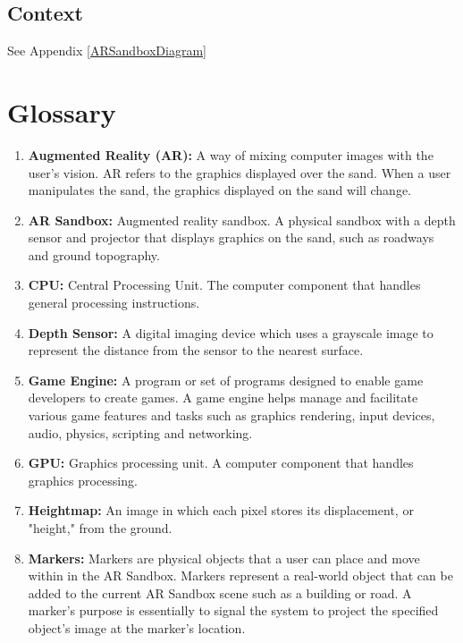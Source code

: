 \documentclass[letterpaper, 10pt, onecolumn, draftclsnofoot]{IEEEtran}
\begin{document}
    \subsection{Context}
    \begin{center}
        See Appendix \ref{ARSandboxDiagram}
    \end{center}
\section{Glossary} 
    \begin{enumerate}[label=]
         \item {\textbf{Augmented Reality (AR):} A way of mixing computer images with the user’s vision. AR refers to the graphics displayed over the sand. When a user manipulates the sand, the graphics displayed on the sand will change.} 
         
        \item {\textbf{AR Sandbox:} Augmented reality sandbox. A physical sandbox with a depth sensor and projector that displays graphics on the sand, such as roadways and ground topography.}
        
        \item {\textbf{CPU:} Central Processing Unit. The computer component that handles general processing instructions.}
         
        \item {\textbf{Depth Sensor:} A digital imaging device which uses a grayscale image to represent the distance from the sensor to the nearest surface.}
        
        \item{\textbf{Game Engine:} A program or set of programs designed to enable game developers to create games. A game engine helps manage and facilitate various game features and tasks such as graphics rendering, input devices, audio, physics, scripting and networking.}
        
        \item {\textbf{GPU:} Graphics processing unit. A computer component that handles graphics processing.}
        
        \item \textbf{Heightmap:} An image in which each pixel stores its displacement, or "height," from the ground.
        
        \item {\textbf{Markers:} Markers are physical objects that a user can place and move within in the AR Sandbox. Markers represent a real-world object that can be added to the current AR Sandbox scene such as a building or road. A marker's purpose is essentially to signal the system to project the specified object's image at the marker's location.}   
        

\end{enumerate}
\end{document}
